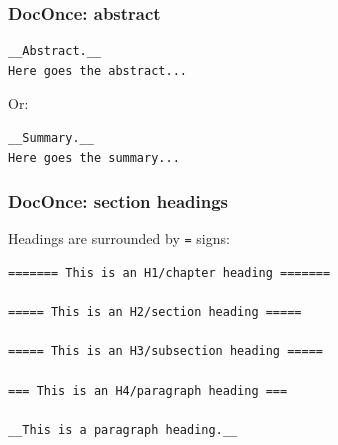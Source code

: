 \documentclass{beamer}
\begin{document}
\begin{frame}
\frametitle{DocOnce: abstract}

\begin{Verbatim}[numbers=none,fontsize=\fontsize{9pt}{9pt},baselinestretch=0.95]
__Abstract.__
Here goes the abstract...

\end{Verbatim}

Or:
\begin{Verbatim}[numbers=none,fontsize=\fontsize{9pt}{9pt},baselinestretch=0.95]
__Summary.__
Here goes the summary...

\end{Verbatim}
\end{frame}

\begin{frame}
\frametitle{DocOnce: section headings}

Headings are surrounded by \texttt{=} signs:
\begin{Verbatim}[numbers=none,fontsize=\fontsize{9pt}{9pt},baselinestretch=0.95]
======= This is an H1/chapter heading =======

===== This is an H2/section heading =====

===== This is an H3/subsection heading =====

=== This is an H4/paragraph heading ===

__This is a paragraph heading.__

\end{Verbatim}
\end{frame}
\end{document}
